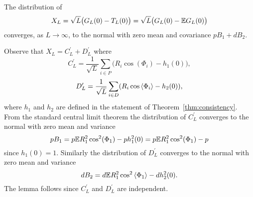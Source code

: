 \documentclass[draftcls, onecolumn, 11pt]{IEEEtran}
\begin{document}



\begin{lemma}\label{lem:XL} 
The distribution of 
\[
X_L = \sqrt{L} \big( G_L(0) - T_L(0) \big) = \sqrt{L} \big( G_L(0) - {\mathbb E} G_L(0) \big)
\] 
converges, as $L \rightarrow\infty$,  to the normal with zero mean and covariance $pB_1 + d B_2.$
\end{lemma}
\begin{IEEEproof}
Observe that $X_L = C_L^\prime + D_L^\prime$ where
\[
C_L^\prime = \frac{1}{\sqrt{L}} \sum_{i \in P} \big( R_i \cos(\Phi_i) - h_1(0) \big),
\]
\[
D_L^\prime = \frac{1}{\sqrt{L}} \sum_{i \in D} (R_i \cos\left\langle \Phi_i \right\rangle - h_2(0) ),
\]
where $h_1$ and $h_2$ are defined in the statement of Theorem~\ref{thm:consistency}.  From the standard central limit theorem the distribution of $C_L^\prime$ converges to the normal with zero mean and variance
\[
p B_1 = p {\mathbb E} R_1^2 \cos^2(\Phi_1) - p h_1^2(0) =  p {\mathbb E} R_1^2 \cos^2(\Phi_1) - p 
\]
since $h_1(0) = 1$.  Similarly the distribution of $D_L^\prime$ converges to the normal with zero mean and variance
\[
d B_2 = d {\mathbb E} R_1^2 \cos^2\left\langle \Phi_1 \right\rangle - d h_2^2(0).
\]
The lemma follows since $C_L^\prime$ and $D_L^\prime$ are independent.
\end{IEEEproof}
\end{document}

